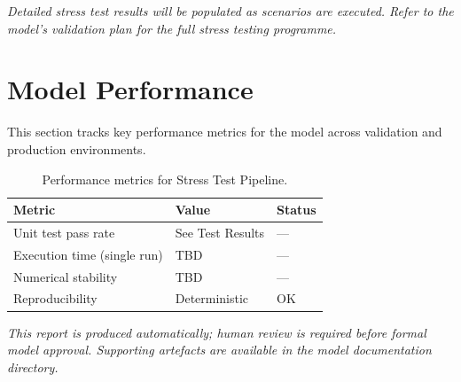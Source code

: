 \documentclass[11pt,a4paper]{article}
\begin{document}
\textit{Detailed stress test results will be populated as scenarios are executed.
Refer to the model's validation plan for the full stress testing programme.}

\section{Model Performance}

This section tracks key performance metrics for the model across
validation and production environments.

\begin{table}[H]
    \centering
    \caption{Performance metrics for Stress Test Pipeline.}
    \begin{tabular}{lll}
        \toprule
        \textbf{Metric} & \textbf{Value} & \textbf{Status} \\
        \midrule
        Unit test pass rate & See Test Results & --- \\
        Execution time (single run) & TBD & --- \\
        Numerical stability & TBD & --- \\
        Reproducibility & Deterministic & OK \\
        \bottomrule
    \end{tabular}
\end{table}

\vspace{12pt}

\noindent\textit{\small This report is produced automatically; human review
is required before formal model approval. Supporting artefacts are available
in the model documentation directory.}
\end{document}
